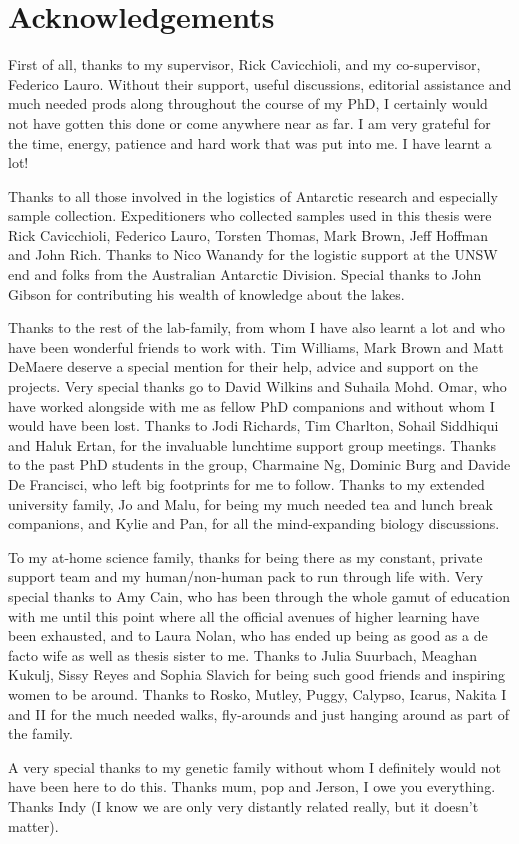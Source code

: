 \chapter*{Acknowledgements}
First of all, thanks to my supervisor, Rick Cavicchioli, and my co-supervisor, Federico Lauro.
Without their support, useful discussions, editorial assistance and much needed prods along throughout the course of my PhD, I certainly would not have gotten this done or come anywhere near as far.
I am very grateful for the time, energy, patience and hard work that was put into me.
I have learnt a lot!

Thanks to all those involved in the logistics of Antarctic research and especially sample collection.
Expeditioners who collected samples used in this thesis were Rick Cavicchioli, Federico Lauro, Torsten Thomas, Mark Brown, Jeff Hoffman and John Rich.
Thanks to Nico Wanandy for the logistic support at the UNSW end and folks from the Australian Antarctic Division.
Special thanks to John Gibson for contributing his wealth of knowledge about the lakes.

Thanks to the rest of the lab-family, from whom I have also learnt a lot and who have been wonderful friends to work with.
Tim Williams, Mark Brown and Matt DeMaere deserve a special mention for their help, advice and support on the projects.
Very special thanks go to David Wilkins and Suhaila Mohd. Omar, who have worked alongside with me as fellow PhD companions and without whom I would have been lost.
Thanks to Jodi Richards, Tim Charlton, Sohail Siddhiqui and Haluk Ertan, for the invaluable lunchtime support group meetings.
Thanks to the past PhD students in the group, Charmaine Ng, Dominic Burg and Davide De Francisci, who left big footprints for me to follow.
Thanks to my extended university family, Jo and Malu, for being my much needed tea and lunch break companions, and Kylie and Pan, for all the mind-expanding biology discussions.

To my at-home science family, thanks for being there as my constant, private support team and my human/non-human pack to run through life with.
Very special thanks to Amy Cain, who has been through the whole gamut of education with me until this point where all the official avenues of higher learning have been exhausted, and to Laura Nolan, who has ended up being as good as a de facto wife as well as thesis sister to me.
Thanks to Julia Suurbach, Meaghan Kukulj, Sissy Reyes and Sophia Slavich for being such good friends and inspiring women to be around.
Thanks to Rosko, Mutley, Puggy, Calypso, Icarus, Nakita I and II for the much needed walks, fly-arounds and just hanging around as part of the family.

A very special thanks to my genetic family without whom I definitely would not have been here to do this.
Thanks mum, pop and Jerson, I owe you everything.
Thanks Indy (I know we are only very distantly related really, but it doesn't matter).
